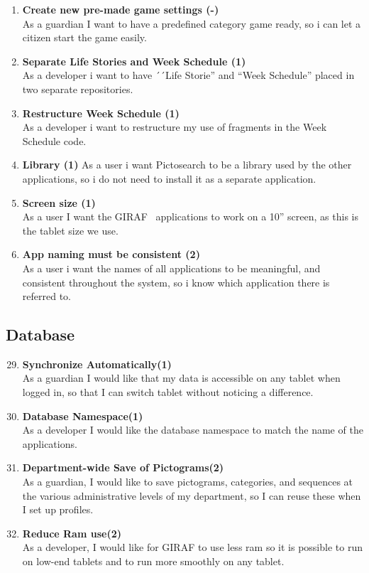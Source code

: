 \begin{enumerate}
	\item \textbf{Create new pre-made game settings (-)}\\
	As a guardian I want to have a predefined category game ready, so i can let a citizen start the game easily. 
	
	\item \textbf{Separate Life Stories and Week Schedule (1)}\\
	As a developer i want to have ´´Life Storie'' and ``Week Schedule'' placed in two separate repositories.
	
	\item \textbf{Restructure Week Schedule (1)}\\
	As a developer i want to restructure my use of fragments in the Week Schedule code.
	
	\item \textbf{Library (1)}
	As a user i want Pictosearch to be a library used by the other applications, so i do not need to install it as a separate application.
	
	\item \textbf{Screen size (1)}\\
	As a user I want the GIRAF~ applications to work on a 10” screen, as this is the tablet size we use.
	
	\item \textbf{App naming must be consistent (2)}\\
	As a user i want the names of all applications to be meaningful, and consistent throughout the system, so i know which application there is referred to.
\end{enumerate}

\subsection{Database}

\begin{enumerate}
	\setcounter{enumi}{28} %
	\item \textbf{Synchronize Automatically(1)}\\
	As a guardian I would like that my data is accessible on any tablet when logged in, so that I can switch tablet without noticing a difference.
	
	\item \textbf{Database Namespace(1)}\\
	As a developer I would like the database namespace to match the name of the applications. 
	
	\item \textbf{Department-wide Save of Pictograms(2)}\\
	As a guardian, I would like to save pictograms, categories, and sequences at the various administrative levels of my department, so I can reuse these when I set up profiles.
	
	\item \textbf{Reduce Ram use(2)}\\
	As a developer, I would like for GIRAF to use less ram so it is possible to run on low-end tablets and to run more smoothly on any tablet. 
\end{enumerate}


